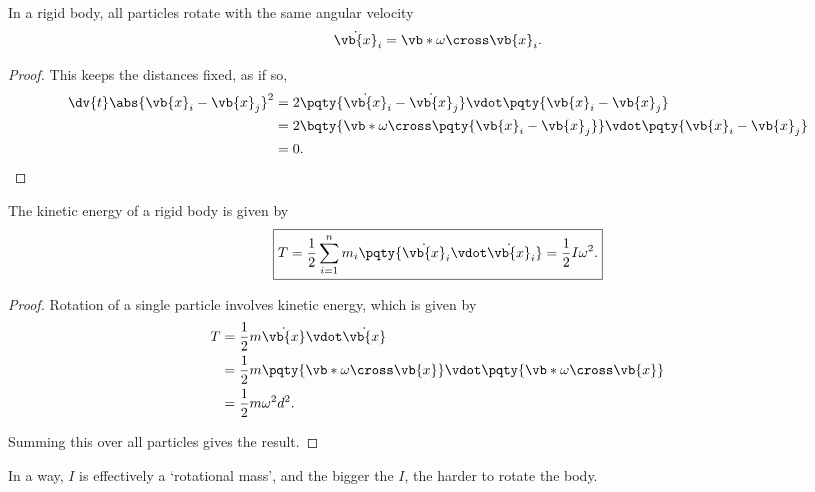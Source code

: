 \begin{lemma}
    \label{lem:particle-identical-angular-velocity}%
    In a rigid body, all particles rotate with the same angular velocity
    \begin{equation}
        \dot{\vb{x}}_i = \vb*{\omega} \cross \vb{x}_i.
    \end{equation}
\end{lemma}

\begin{proof}
    This keeps the distances fixed, as if so,
    \begin{subequations}\begin{align}
        \dv{t} \abs{\vb{x}_i - \vb{x}_j}^2 &= 2 \pqty{\dot{\vb{x}}_i - \dot{\vb{x}}_j} \vdot \pqty{\vb{x}_i - \vb{x}_j} \\
        &= 2 \bqty{\vb*{\omega} \cross \pqty{\vb{x}_i - \vb{x}_j}} \vdot \pqty{\vb{x}_i - \vb{x}_j} \\
        &= 0.
    \end{align}\end{subequations}
\end{proof}

\begin{proposition}
    The kinetic energy of a rigid body is given by
    \begin{equation}
        \boxed{T = \frac{1}{2} \sum_{i = 1}^{n} m_i \pqty{\dot{\vb{x}}_i \vdot \dot{\vb{x}}_i} = \frac{1}{2} I \omega^2.}
    \end{equation}
\end{proposition}

\begin{proof}    
    Rotation of a single particle involves kinetic energy, which is given by
    \begin{subequations}\begin{align}
        T &= \frac{1}{2} m \dot{\vb{x}} \vdot \dot{\vb{x}} \\
        &= \frac{1}{2} m \pqty{\vb*{\omega} \cross \vb{x}} \vdot \pqty{\vb*{\omega} \cross \vb{x}} \\
        &= \frac{1}{2} m \omega^2 d^2.
    \end{align}\end{subequations}

    Summing this over all particles gives the result.
\end{proof}

In a way, \(I\) is effectively a `rotational mass', and the bigger the \(I\), the harder to rotate the body.

